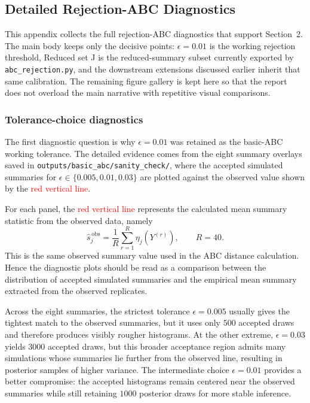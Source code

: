 \documentclass[11pt]{article}
\begin{document}
\subsection{Detailed Rejection-ABC Diagnostics}
\label{app:rejection-diagnostics}

This appendix collects the full rejection-ABC diagnostics that support Section~2. The main body keeps only the decisive points: $\epsilon=0.01$ is the working rejection threshold, Reduced set J is the reduced-summary subset currently exported by \texttt{abc\_rejection.py}, and the downstream extensions discussed earlier inherit that same calibration. The remaining figure gallery is kept here so that the report does not overload the main narrative with repetitive visual comparisons.

\subsubsection{Tolerance-choice diagnostics}

The first diagnostic question is why $\epsilon = 0.01$ was retained as the basic-ABC working tolerance. The detailed evidence comes from the eight summary overlays saved in \texttt{outputs/basic\_abc/sanity\_check/}, where the accepted simulated summaries for $\epsilon \in \{0.005,0.01,0.03\}$ are plotted against the observed value shown by the \textcolor{red}{red vertical line}.

For each panel, the \textcolor{red}{red vertical line} represents the calculated mean summary statistic from the observed data, namely
\[
\widehat{s}^{\,\mathrm{obs}}_j = \frac{1}{R}\sum_{r=1}^{R}\eta_j\!\left(Y^{(r)}\right),
\qquad R = 40.
\]
This is the same observed summary value used in the ABC distance calculation. Hence the diagnostic plots should be read as a comparison between the distribution of accepted simulated summaries and the empirical mean summary extracted from the observed replicates.

Across the eight summaries, the strictest tolerance $\epsilon = 0.005$ usually gives the tightest match to the observed summaries, but it uses only $500$ accepted draws and therefore produces visibly rougher histograms. At the other extreme, $\epsilon = 0.03$ yields $3000$ accepted draws, but this broader acceptance region admits many simulations whose summaries lie further from the observed line, resulting in posterior samples of higher variance. The intermediate choice $\epsilon = 0.01$ provides a better compromise: the accepted histograms remain centered near the observed summaries while still retaining $1000$ posterior draws for more stable inference.
\end{document}
